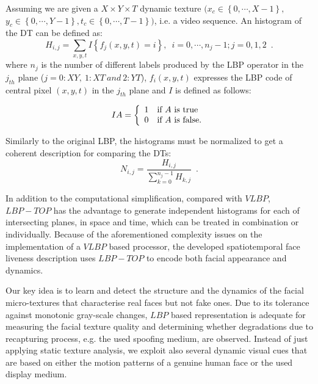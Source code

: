 Assuming we are given a $X\times Y \times T$ dynamic texture $(x_c \in \left\{0,\cdots,X-1\right\},$ $y_c \in\left\{0,\cdots,Y-1\right\}, t_c\in\left\{0,\cdots,T-1\right\})$, i.e. a video sequence. An histogram of the DT can be defined as: 
\begin{equation}
H_{i,j}=\sum_{x,y,t}I\left\{f_{j}(x,y,t)=i\right\},\enspace i=0,\cdots,n_j-1;j=0,1,2 \enspace.
\end{equation}
where $n_j$ is the number of different labels produced by the LBP operator in the $j_{th}$ plane ($j=0: XY,~1: XT~and~2: YT$), $f_i(x,y,t)$ expresses the LBP code of central pixel $(x,y,t)$ in the $j_{th}$ plane and $I$ is defined as follows:

\begin{equation}
I{A} = \left\{ 
  \begin{array}{l l}
    1 &  \textrm{if $A$ is true}\\
    0 &  \textrm{if $A$ is false.}\\
  \end{array} \right.
\end{equation}


Similarly to the original LBP, the histograms must be normalized to get a coherent description for comparing the DTs:
\begin{equation}
N_{i,j}=\frac{H_{i,j}}{\sum_{k=0}^{n_j-1}H_{k,j}} \enspace .
\end{equation}

In addition to the computational simplification, compared with $VLBP$, $LBP-TOP$ has the advantage to generate independent histograms for each of intersecting planes, in space and time, which can be treated in combination or individually. Because of the aforementioned complexity issues on the implementation of a $VLBP$ based processor, the developed spatiotemporal face liveness description uses $LBP-TOP$ to encode both facial appearance and dynamics. 

Our key idea is to learn and detect the structure and the dynamics of the facial micro-textures that characterise real faces but not fake ones. Due to its tolerance against monotonic gray-scale changes, $LBP$ based representation is adequate for measuring the facial texture quality and determining whether degradations due to recapturing process, e.g. the used spoofing medium, are observed. Instead of just applying static texture analysis, we exploit also several dynamic visual cues that are based on either the motion patterns of a genuine human face or the used display medium.

